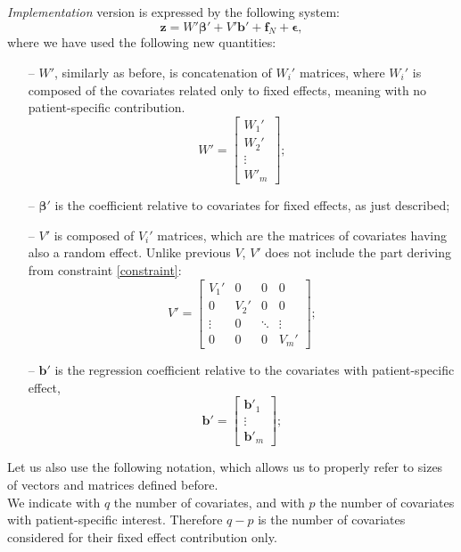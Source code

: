 \textit{Implementation} version is expressed by the following system:
\begin{equation}
	\bm{z}=W' \bm{\beta}' +V'\bm{b}' +\bm{f}_N + \bm{\epsilon},
\end{equation}
where we have used the following new quantities:
\begin{itemize}
	\item[--] $W'$, similarly as before, is concatenation of $W_i'$ matrices, where
		$W_i'$ is composed of the covariates related only to fixed effects, meaning
		with no patient-specific contribution.
		\begin{equation}
			W'=
			\begin{bmatrix*}
				W_1'\\
				W_2'\\
				\vdots\\
				W'_{m}
			\end{bmatrix*}
			;
		\end{equation}
	\item[--] $\bm{\beta}'$ is the coefficient relative to covariates for
		fixed effects, as just described; \item[--] $V'$ is composed of $V_i'$
		matrices, which are the matrices of covariates having also a random effect.
		Unlike previous $V$, $V'$ does not include the part deriving from constraint
		\ref{constraint}:
		\begin{equation}
			V'=
			\begin{bmatrix*}
				V_1' & 0 & 0 & 0\\
				0 & V_2' & 0 & 0\\
				\vdots & 0 & \ddots & \vdots\\
				0 & 0 & 0 & V_{m}'
			\end{bmatrix*}
			;
		\end{equation}
	\item[--] $\bm{b}'$ is the regression coefficient relative to the
		covariates with patient-specific effect,
		\begin{equation}
			\bm{b}'=
			\begin{bmatrix*}
				\bm{b}'_1\\
				\vdots\\
				\bm{b}'_{m}
			\end{bmatrix*}
			;
		\end{equation}
\end{itemize}
Let us also use the following notation, which allows us to properly
refer to sizes of vectors and matrices defined before.\\ We indicate with $q$
the number of covariates, and with $p$ the number of covariates with
patient-specific interest. Therefore $q-p$ is the number of covariates
considered for their fixed effect contribution only.

